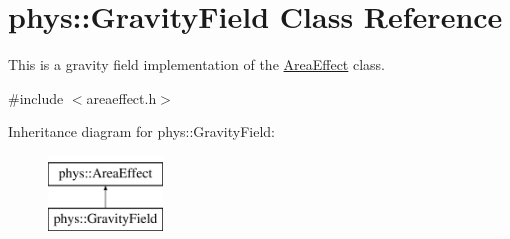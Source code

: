 \hypertarget{classphys_1_1GravityField}{
\section{phys::GravityField Class Reference}
\label{d4/d8a/classphys_1_1GravityField}
}


This is a gravity field implementation of the \hyperlink{classphys_1_1AreaEffect}{AreaEffect} class.  




{\ttfamily \#include $<$areaeffect.h$>$}

Inheritance diagram for phys::GravityField:\begin{figure}[H]
\begin{center}
\leavevmode
\includegraphics[height=2.000000cm]{d4/d8a/classphys_1_1GravityField}
\end{center}
\end{figure}

